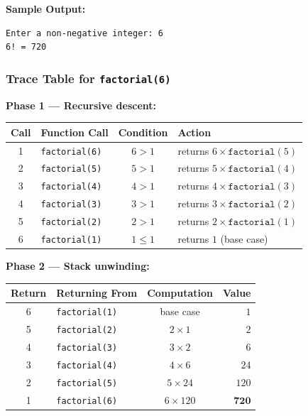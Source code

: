 \noindent\textbf{Sample Output:}
\begin{verbatim}
Enter a non-negative integer: 6
6! = 720
\end{verbatim}

\subsubsection{Trace Table for \texttt{factorial(6)}}

\noindent\textbf{Phase 1 --- Recursive descent:}

\begin{center}
\renewcommand{\arraystretch}{1.3}
\begin{tabular}{@{}clcl@{}}
\toprule
\textbf{Call} & \textbf{Function Call}
    & \textbf{Condition}
    & \textbf{Action} \\
\midrule
1 & \texttt{factorial(6)} & $6 > 1$
    & returns $6 \times \texttt{factorial}(5)$ \\
2 & \texttt{factorial(5)} & $5 > 1$
    & returns $5 \times \texttt{factorial}(4)$ \\
3 & \texttt{factorial(4)} & $4 > 1$
    & returns $4 \times \texttt{factorial}(3)$ \\
4 & \texttt{factorial(3)} & $3 > 1$
    & returns $3 \times \texttt{factorial}(2)$ \\
5 & \texttt{factorial(2)} & $2 > 1$
    & returns $2 \times \texttt{factorial}(1)$ \\
6 & \texttt{factorial(1)} & $1 \leq 1$
    & returns $1$ \quad (base case) \\
\bottomrule
\end{tabular}
\end{center}

\noindent\textbf{Phase 2 --- Stack unwinding:}

\begin{center}
\renewcommand{\arraystretch}{1.3}
\begin{tabular}{@{}clcr@{}}
\toprule
\textbf{Return} & \textbf{Returning From}
    & \textbf{Computation}
    & \textbf{Value} \\
\midrule
6 & \texttt{factorial(1)} & base case
    & $1$ \\
5 & \texttt{factorial(2)} & $2 \times 1$
    & $2$ \\
4 & \texttt{factorial(3)} & $3 \times 2$
    & $6$ \\
3 & \texttt{factorial(4)} & $4 \times 6$
    & $24$ \\
2 & \texttt{factorial(5)} & $5 \times 24$
    & $120$ \\
1 & \texttt{factorial(6)} & $6 \times 120$
    & $\mathbf{720}$ \\
\bottomrule
\end{tabular}
\end{center}

